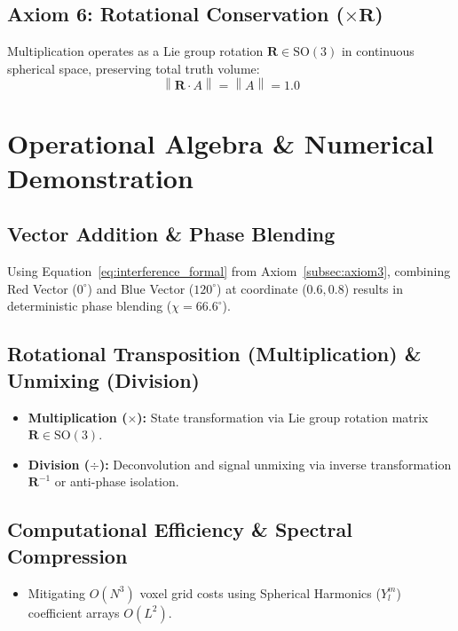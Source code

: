 \documentclass[12pt, a4paper]{article}
\providecommand{\norm}[1]{\left\lVert#1\right\rVert}
\begin{document}
\subsection{Axiom 6: Rotational Conservation (\texorpdfstring{$\times \mathbf{R}$}{x R})}
\label{subsec:axiom_rotation}
Multiplication operates as a Lie group rotation $\mathbf{R} \in \mathrm{SO}(3)$ in continuous spherical space, preserving total truth volume:
\begin{equation}
    \norm{\mathbf{R} \cdot A} = \norm{A} = 1.0
\end{equation}

\section{Operational Algebra \& Numerical Demonstration}

\subsection{Vector Addition \& Phase Blending}
Using Equation~\eqref{eq:interference_formal} from Axiom~\ref{subsec:axiom3}, combining Red Vector ($0^\circ$) and Blue Vector ($120^\circ$) at coordinate ($0.6, 0.8$) results in deterministic phase blending ($\chi = 66.6^\circ$).

\subsection{Rotational Transposition (Multiplication) \& Unmixing (Division)}
\begin{itemize}
    \item \textbf{Multiplication ($\times$):} State transformation via Lie group rotation matrix $\mathbf{R} \in \mathrm{SO}(3)$.
    \item \textbf{Division ($\div$):} Deconvolution and signal unmixing via inverse transformation $\mathbf{R}^{-1}$ or anti-phase isolation.
\end{itemize}

\subsection{Computational Efficiency \& Spectral Compression}
\begin{itemize}
    \item Mitigating $O(N^3)$ voxel grid costs using Spherical Harmonics ($Y_l^m$) coefficient arrays $O(L^2)$.
\end{itemize}
\end{document}
